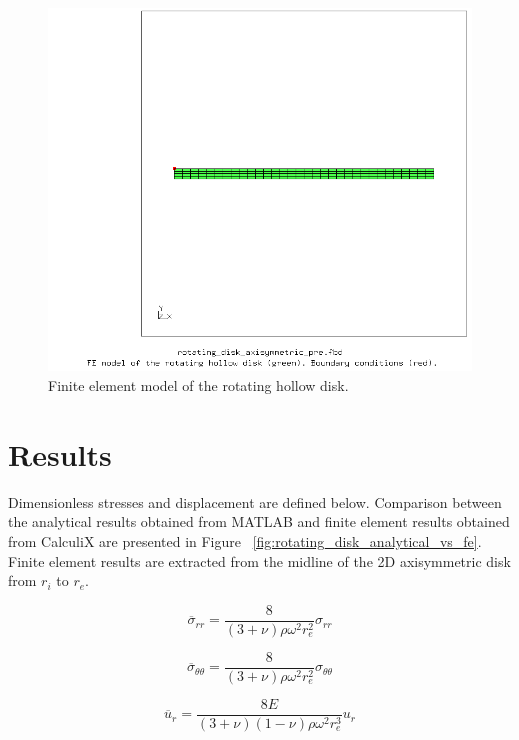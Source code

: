 \documentclass[12pt, a4paper, twoside]{article}
\begin{document}
\begin{figure}[h]
	\centering
	\includegraphics[scale=0.4]{pre}
	\caption{Finite element model of the rotating hollow disk.}
	\label{fig:pre}
\end{figure}

\section{Results}
Dimensionless stresses and displacement are defined below. Comparison between the analytical results obtained from MATLAB and finite element results obtained from CalculiX are presented in Figure ~\ref{fig:rotating_disk_analytical_vs_fe}. Finite element results are extracted from the midline of the 2D axisymmetric disk from $r_i$ to $r_e$.

\begin{equation}
\label{equation:dimensionless_sigma_rr}
{ \overline{{\sigma }}_{rr}=}{\frac {8} {(3+{\nu }){\rho }{{\omega }^{2}{r}^{2}_{e}}}}{\sigma }_{rr}
\end{equation}

\begin{equation}
\label{equation:dimensionless_sigma_tt}
{\overline{\sigma }_{{\theta }{\theta }}=}{\frac {8} {(3+{\nu }){\rho }{{\omega }^{2}{r}^{2}_{e}}}}{\sigma }_{{\theta }{\theta }} 
\end{equation}

\begin{equation}
\label{equation:dimensionless_u_r}
{\overline{u}_{r}=}{\frac {8E} {(3+{\nu })(1-{\nu }){\rho }{{\omega }^{2}{r}^{3}_{e}}}}{u}_{r}
\end{equation}
\end{document}
